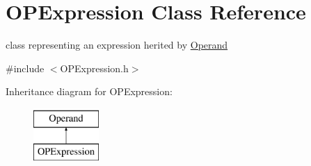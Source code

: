\hypertarget{classOPExpression}{\section{\-O\-P\-Expression \-Class \-Reference}
\label{classOPExpression}
}


class representing an expression herited by \hyperlink{classOperand}{\-Operand}  




{\ttfamily \#include $<$\-O\-P\-Expression.\-h$>$}

\-Inheritance diagram for \-O\-P\-Expression\-:\begin{figure}[H]
\begin{center}
\leavevmode
\includegraphics[height=2.000000cm]{classOPExpression}
\end{center}
\end{figure}
